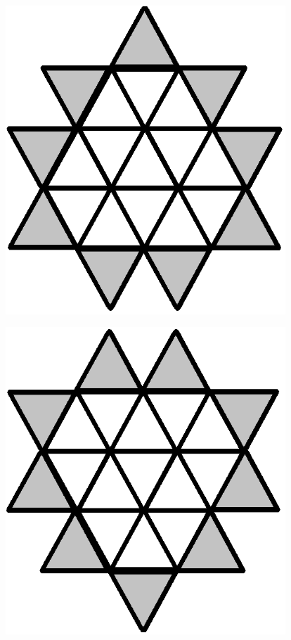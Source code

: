 \documentclass{article}
\newenvironment{Figure}
  {\par\medskip\noindent\minipage{\linewidth}}
  {\endminipage\par\medskip}
\begin{document}
\begin{multicols}{2}
\begin{Figure}
\label{fig:exthexstd}
\end{Figure}
\begin{Figure}
 \centering
 \includegraphics[width=0.79\textwidth]{imgs/extendedtriangle1.png}
\label{fig:exttriangle1std}
\end{Figure}
\begin{Figure}
 \centering
 \includegraphics[width=0.79\textwidth]{imgs/extendedtriangle2.png}
\label{fig:exttriangle2std}
\end{Figure}


\end{multicols}
\end{document}
